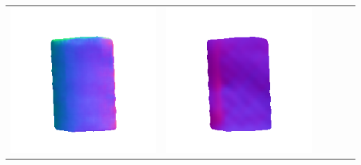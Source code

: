\begin{center}
\begin{tabularx}{\linewidth}{@{}Y@{}Y@{}Y@{}Y@{}Y@{}Y@{}}
\includegraphics[width=\linewidth]{semisynthetic/20150514_18_marrnet_out.png} &
\includegraphics[width=\linewidth]{semisynthetic/20150514_18_ef_out.png} \\

\end{tabularx}
\end{center}
